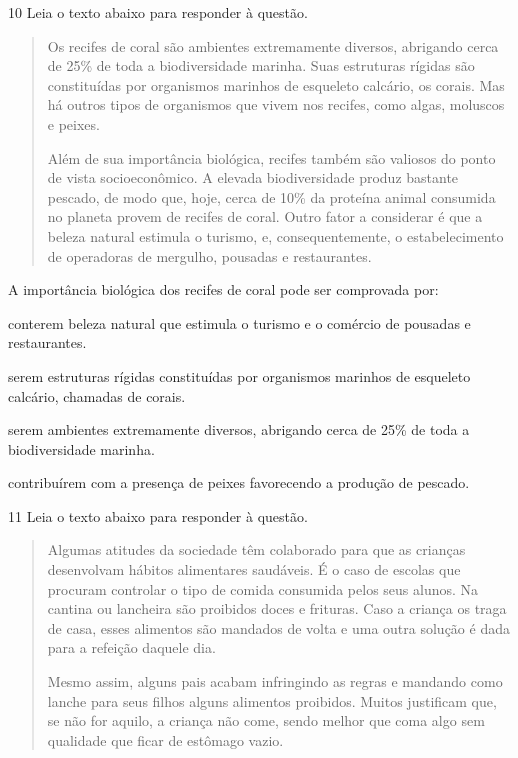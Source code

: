 \num{10} Leia o texto abaixo para responder à questão. 

\begin{quote}

Os recifes de coral são ambientes extremamente diversos, abrigando cerca
de 25\% de toda a biodiversidade marinha. Suas estruturas rígidas são
constituídas por organismos marinhos de esqueleto calcário, os corais.
Mas há outros tipos de organismos que vivem nos recifes, como algas,
moluscos e peixes.

Além de sua importância biológica, recifes também são valiosos do ponto
de vista socioeconômico. A elevada biodiversidade produz bastante
pescado, de modo que, hoje, cerca de 10\% da proteína animal consumida
no planeta provem de recifes de coral. Outro fator a considerar é que a
beleza natural estimula o turismo, e, consequentemente, o
estabelecimento de operadoras de mergulho, pousadas e restaurantes.

\end{quote}


A importância biológica dos recifes de coral pode ser comprovada por:

\begin{escolha}
    
    \item conterem beleza natural que estimula o turismo e o comércio de
  pousadas e restaurantes.
    
    \item serem estruturas rígidas constituídas por organismos marinhos de
  esqueleto calcário, chamadas de corais.
    
    \item serem ambientes extremamente diversos, abrigando cerca de 25\% de
  toda a biodiversidade marinha.
    
    \item contribuírem com a presença de peixes favorecendo a produção de
  pescado.

\end{escolha}

\num{11} Leia o texto abaixo para responder à questão. 

\begin{quote}

Algumas atitudes da sociedade têm colaborado para que as crianças
desenvolvam hábitos alimentares saudáveis. É o caso de escolas que
procuram controlar o tipo de comida consumida pelos seus alunos. Na
cantina ou lancheira são proibidos doces e frituras. Caso a criança os
traga de casa, esses alimentos são mandados de volta e uma outra solução
é dada para a refeição daquele dia.

Mesmo assim, alguns pais acabam infringindo as regras e mandando como
lanche para seus filhos alguns alimentos proibidos. Muitos justificam
que, se não for aquilo, a criança não come, sendo melhor que coma algo
sem qualidade que ficar de estômago vazio.

\end{quote}

